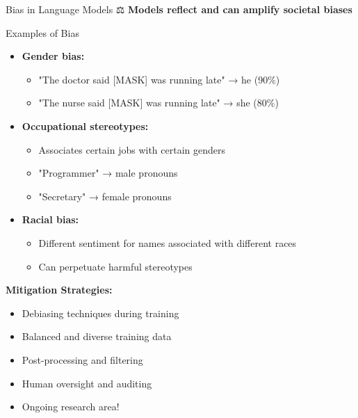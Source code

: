 \documentclass[aspectratio=169]{beamer}
\begin{document}
\begin{frame}[shrink=10]{Bias in Language Models ⚖️}
\textbf{Models reflect and can amplify societal biases}

\vspace{1em}

\begin{alertblock}{Examples of Bias}
\begin{itemize}\setlength{\itemsep}{0pt}
    \item \textbf{Gender bias:}
    \begin{itemize}\setlength{\itemsep}{0pt}
        \item "The doctor said [MASK] was running late" → he (90\%)
        \item "The nurse said [MASK] was running late" → she (80\%)
    \end{itemize}

    \item \textbf{Occupational stereotypes:}
    \begin{itemize}\setlength{\itemsep}{0pt}
        \item Associates certain jobs with certain genders
        \item "Programmer" → male pronouns
        \item "Secretary" → female pronouns
    \end{itemize}

    \item \textbf{Racial bias:}
    \begin{itemize}\setlength{\itemsep}{0pt}
        \item Different sentiment for names associated with different races
        \item Can perpetuate harmful stereotypes
    \end{itemize}
\end{itemize}
\end{alertblock}

\vspace{1em}

\textbf{Mitigation Strategies:}
\begin{itemize}\setlength{\itemsep}{0pt}
    \item Debiasing techniques during training
    \item Balanced and diverse training data
    \item Post-processing and filtering
    \item Human oversight and auditing
    \item Ongoing research area!
\end{itemize}
\end{frame}
\end{document}

